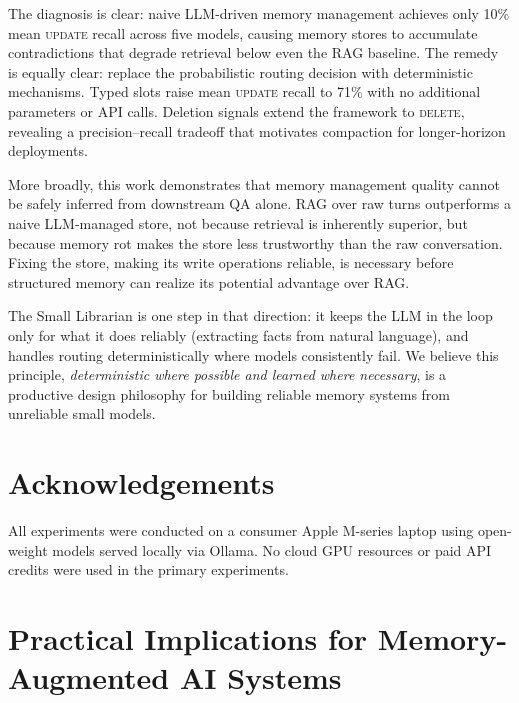 \documentclass[10pt, twocolumn]{article}
\begin{document}
The diagnosis is clear: naive LLM-driven memory management achieves only
10\% mean \textsc{update} recall across five models, causing memory stores to
accumulate contradictions that degrade retrieval below even the RAG baseline.
The remedy is equally clear: replace the probabilistic routing decision with
deterministic mechanisms.
Typed slots raise mean \textsc{update} recall to 71\% with no additional
parameters or API calls.
Deletion signals extend the framework to \textsc{delete}, revealing a
precision--recall tradeoff that motivates compaction for longer-horizon
deployments.

More broadly, this work demonstrates that memory management quality cannot
be safely inferred from downstream QA alone.
RAG over raw turns outperforms a naive LLM-managed store, not because
retrieval is inherently superior, but because memory rot makes the store
less trustworthy than the raw conversation.
Fixing the store, making its write operations reliable, is necessary
before structured memory can realize its potential advantage over RAG.

The Small Librarian is one step in that direction: it keeps the LLM in
the loop only for what it does reliably (extracting facts from natural
language), and handles routing deterministically where models consistently
fail.
We believe this principle, \emph{deterministic where possible and learned
where necessary}, is a productive design philosophy for building reliable
memory systems from unreliable small models.

\section*{Acknowledgements}

All experiments were conducted on a consumer Apple M-series laptop using
open-weight models served locally via Ollama.
No cloud GPU resources or paid API credits were used in the primary
experiments.

\section*{Practical Implications for Memory-Augmented AI Systems}
\label{sec:implications}
\end{document}
